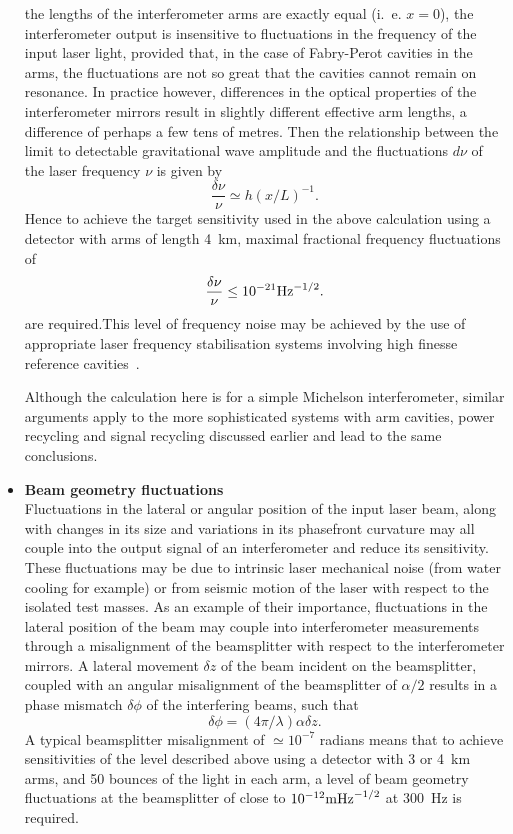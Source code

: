\documentclass{article}
\begin{document}
\begin{itemize}
the lengths of the interferometer arms are exactly equal (i.~e. $x = 0$), the
interferometer output is insensitive to fluctuations in the frequency of the
input laser light, provided that, in the case of Fabry-Perot cavities in the
arms, the fluctuations are not so great that the cavities cannot remain on
resonance.  In practice however, differences in the optical properties of the
interferometer mirrors result in  slightly different effective arm lengths, a
difference of perhaps a few tens of metres. Then the relationship between
the limit to detectable gravitational wave amplitude and the fluctuations
$d\nu$ of the laser frequency $\nu$ is given by~\cite{Hough}
%
\begin{equation}
  \frac{\delta \nu}{\nu} \simeq h(x/L)^{-1}.
  \label{equation:frequnoise}
\end{equation}
%
Hence to achieve the target sensitivity used in the above calculation using a
detector with arms of length 4~km, maximal fractional frequency fluctuations of
%
\begin{equation}
  \frac{\delta \nu}{\nu} \leq 10^{-21}{\rm Hz}^{-1/2}.
  \label{equation:freqspecification}
\end{equation}
%
are required.This level of frequency noise may be achieved by the use of
appropriate laser frequency stabilisation systems involving high finesse
reference cavities~\cite{Hough}.

Although the calculation here is for a simple Michelson interferometer, similar
arguments apply to the more sophisticated systems with arm cavities, power
recycling and signal recycling discussed earlier and lead to the same
conclusions.

\item {\bf Beam geometry fluctuations} \\
Fluctuations in the lateral or angular position of the input laser beam, along
with changes in its size and variations in its phasefront curvature may all
couple into the output signal of an interferometer and reduce its sensitivity.
These fluctuations may be due to intrinsic laser mechanical noise (from water
cooling for example) or from seismic motion of the laser with respect to the
isolated test masses. As an example of their importance, fluctuations in the
lateral position of the beam may couple into interferometer measurements through
a misalignment of the beamsplitter with respect to the interferometer mirrors. A
lateral movement $\delta z$ of the beam incident on the beamsplitter, coupled
with an angular misalignment of the beamsplitter of $\alpha/2$ results in a
phase mismatch $\delta \phi$ of the interfering beams, such that~\cite{Rudiger}
%
\begin{equation}
  \delta \phi = (4 \pi/\lambda) \alpha \delta z.
  \label{equation:beamgeomfluc}
\end{equation}
%
A typical beamsplitter misalignment of $\simeq 10^{-7}$ radians means that to
achieve sensitivities of the level described above using a detector with 3 or
4~km arms, and 50 bounces of the light in each arm, a level of beam geometry
fluctuations at the beamsplitter of close to $10^{-12}{\rm m}{\rm Hz}^{-1/2}$ at
300~Hz is required.


\end{itemize}
\end{document}
